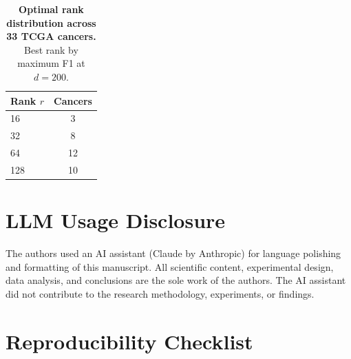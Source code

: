 \documentclass{article}
\theoremstyle{definition}
\begin{document}
\begin{table}[H]
\centering
\caption{\textbf{Optimal rank distribution across 33 TCGA cancers.} Best rank by maximum F1 at $d=200$.}
\label{tab:rank_dist}
\small
\begin{tabular}{lc}
\toprule
Rank $r$ & Cancers \\
\midrule
16 & 3 \\
32 & 8 \\
64 & 12 \\
128 & 10 \\
\bottomrule
\end{tabular}
\end{table}

\section{LLM Usage Disclosure}
The authors used an AI assistant (Claude by Anthropic) for language polishing and formatting of this manuscript. All scientific content, experimental design, data analysis, and conclusions are the sole work of the authors. The AI assistant did not contribute to the research methodology, experiments, or findings.

\section{Reproducibility Checklist}
\end{document}
